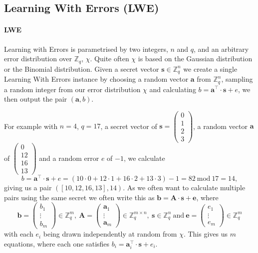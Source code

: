 \documentclass[a4paper, 11pt, openany]{book}
\numberwithin{equation}{section}
\theoremstyle{plain}
\theoremstyle{definition}
\begin{document}
\subsection{Learning With Errors (LWE)}
\paragraph{LWE}
Learning with Errors is parametrised by two integers, $n$ and $q$, and an arbitrary error distribution over $\mathbb{Z}_{q}$, $\chi$. Quite often $\chi$ is based on the Gaussian distribution or the Binomial distribution. Given a secret vector $\textbf{s} \in \mathbb{Z}_{q}^{n}$ we create a single Learning With Errors instance by choosing a random vector $\textbf{a}$ from $\mathbb{Z}_{q}^{n}$, sampling a random integer from  our error distribution $\chi$ and calculating $b = \textbf{a}^{\top}\cdot\textbf{s} + e$, we then output the pair $(\textbf{a},b)$.

For example with $n = 4$, $q = 17$, a secret vector of $\textbf{s} = \begin{pmatrix}0\\1\\2\\3\end{pmatrix}$, a random vector $\textbf{a}$ of $\begin{pmatrix}0\\12\\16\\13\end{pmatrix}$ and a random error $e$ of $-1$, we calculate  
\[
    b = \textbf{a}^{\top}\cdot\textbf{s} + e = (10\cdot0 +12\cdot1 +16\cdot2 +13\cdot3) - 1 = 82 ~\text{mod}~ 17 = 14,
\]
giving us a pair $([10,12,16,13],14)$.
As we often want to calculate multiple pairs using the same secret we often write this as $\textbf{b} = \textbf{A}\cdot \textbf{s} + \textbf{e}$, where $$\textbf{b} = \begin{pmatrix}b_{1}\\ \vdots\\  b_{m}\end{pmatrix}\in \mathbb{Z}_{q}^{m},~ \textbf{A} = \begin{pmatrix}\textbf{a}_{1} \\ \vdots \\ \textbf{a}_{m}\end{pmatrix} \in \mathbb{Z}_{q}^{m \times n},~ \textbf{s} \in \mathbb{Z}_{q}^{n} ~\text{and}~ \textbf{e} =\begin{pmatrix}e_{1}\\ \vdots\\  e_{m}\end{pmatrix} \in \mathbb{Z}_{q}^{m}$$ with each $e_{i}$ being drawn independently at random from $\chi$. This gives us $m$ equations, where each one satisfies $b_{i} =  \textbf{a}_{i}^{\top}\cdot\textbf{s} + e_{i}$.
\end{document}
